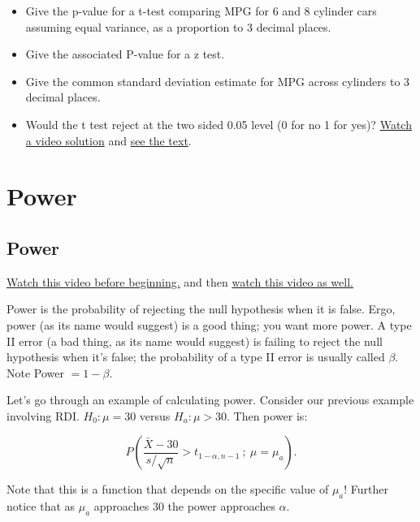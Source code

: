 \documentclass[]{article}
\begin{document}
\begin{itemize}
\itemsep1pt\parskip0pt
\item
  Give the p-value for a t-test comparing MPG for 6 and 8 cylinder cars
  assuming equal variance, as a proportion to 3 decimal places.
\item
  Give the associated P-value for a z test.
\item
  Give the common standard deviation estimate for MPG across cylinders
  to 3 decimal places.
\item
  Would the t test reject at the two sided 0.05 level (0 for no 1 for
  yes)?
  \href{https://www.youtube.com/watch?v=m0B5p0w2wJI\&list=PLpl-gQkQivXhHOcVeU3bSJg78zaDYbP9L\&index=37}{Watch
  a video solution} and
  \href{http://bcaffo.github.io/courses/06_StatisticalInference/homework/hw4.html\#13}{see
  the text}.
\end{itemize}

\newpage

\section{Power}\label{power}

\subsection{Power}\label{power-1}

\href{http://youtu.be/-TsBOLiW4rQ?list=PLpl-gQkQivXiBmGyzLrUjzsblmQsLtkzJ}{Watch
this video before beginning.} and then
\href{http://youtu.be/GRS2b1aedmk?list=PLpl-gQkQivXiBmGyzLrUjzsblmQsLtkzJ}{watch
this video as well.}

Power is the probability of rejecting the null hypothesis when it is
false. Ergo, power (as its name would suggest) is a good thing; you want
more power. A type II error (a bad thing, as its name would suggest) is
failing to reject the null hypothesis when it's false; the probability
of a type II error is usually called $\beta$. Note Power $= 1 - \beta$.

Let's go through an example of calculating power. Consider our previous
example involving RDI. $H_0: \mu = 30$ versus $H_a: \mu > 30$. Then
power is:

\[P\left(\frac{\bar X - 30}{s /\sqrt{n}} > t_{1-\alpha,n-1} ~;~ \mu = \mu_a \right).\]

Note that this is a function that depends on the specific value of
$\mu_a$! Further notice that as $\mu_a$ approaches 30 the power
approaches $\alpha$.
\end{document}
